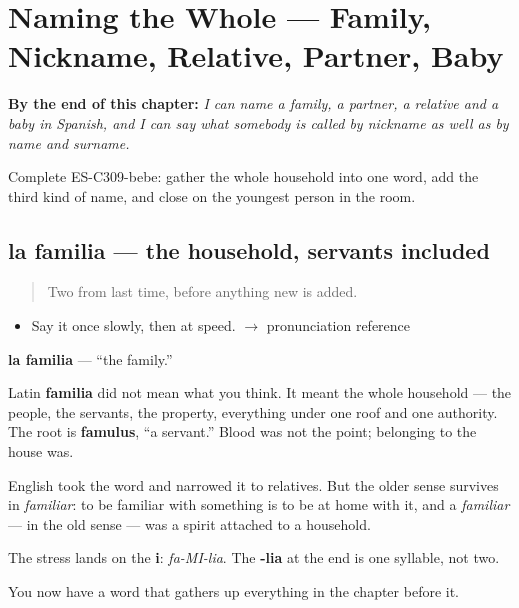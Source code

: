 
\chapter{Naming the Whole --- Family, Nickname, Relative, Partner, Baby}
\label{ch:familia-y-pareja}

\begin{chapteropening}
\textbf{By the end of this chapter:} \emph{I can name a family, a partner, a relative and a baby in Spanish, and I can say what somebody is called by nickname as well as by name and surname.}

Complete ES-C309-bebe: gather the whole household into one word, add the third kind of name, and close on the youngest person in the room.
\end{chapteropening}

\section[la familia]{la familia --- the household, servants included}

\label{lesson:ES-C309-familia}



\begin{quote}
Two from last time, before anything new is added.
\end{quote}

\begin{sounds}
\begin{itemize}
\raggedright
  \item Say it once slowly, then at speed. $\to$ pronunciation reference
\end{itemize}
\end{sounds}

\begin{cousinweb}
\textbf{la familia} --- \textquotedblleft{}the family.\textquotedblright{}

Latin \textbf{familia} did not mean what you think. It meant the whole household --- the people, the servants, the property, everything under one roof and one authority. The root is \textbf{famulus}, \textquotedblleft{}a servant.\textquotedblright{} Blood was not the point; belonging to the house was.

English took the word and narrowed it to relatives. But the older sense survives in \emph{familiar}: to be familiar with something is to be at home with it, and a \emph{familiar} --- in the old sense --- was a spirit attached to a household.

The stress lands on the \textbf{i}: \emph{fa-MI-lia}. The \textbf{-lia} at the end is one syllable, not two.

You now have a word that gathers up everything in the chapter before it.
\end{cousinweb}

